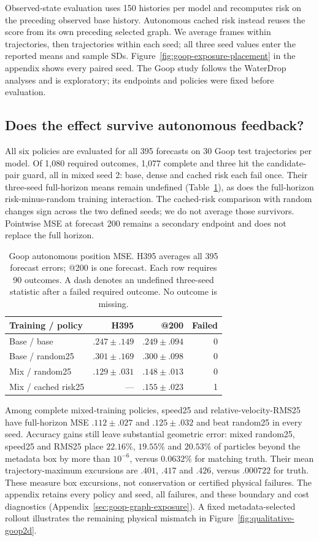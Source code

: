 Observed-state evaluation uses 150 histories per model and recomputes risk on the preceding observed base history. Autonomous cached risk instead reuses the score from its own preceding selected graph. We average frames within trajectories, then trajectories within each seed; all three seed values enter the reported means and sample SDs. Figure~\ref{fig:goop-exposure-placement} in the appendix shows every paired seed. The Goop study follows the WaterDrop analyses and is exploratory; its endpoints and policies were fixed before evaluation.

\subsection{Does the effect survive autonomous feedback?}
All six policies are evaluated for all 395 forecasts on 30 Goop test trajectories per model. Of 1,080 required outcomes, 1,077 complete and three hit the candidate-pair guard, all in mixed seed 2: base, dense and cached risk each fail once. Their three-seed full-horizon means remain undefined (Table~\ref{tab:goop-rollouts}), as does the full-horizon risk-minus-random training interaction. The cached-risk comparison with random changes sign across the two defined seeds; we do not average those survivors. Pointwise MSE at forecast 200 remains a secondary endpoint and does not replace the full horizon.

\begin{table}[t]
\centering\small
\caption{Goop autonomous position MSE. H395 averages all 395 forecast errors; @200 is one forecast. Each row requires 90 outcomes. A dash denotes an undefined three-seed statistic after a failed required outcome. No outcome is missing.}
\label{tab:goop-rollouts}
\setlength{\tabcolsep}{3pt}
\begin{tabular}{lrrr}
\toprule
Training / policy & H395 & @200 & Failed\\
\midrule
Base / base & $.247\pm.149$ & $.249\pm.094$ & 0\\
Base / random25 & $.301\pm.169$ & $.300\pm.098$ & 0\\
Mix / random25 & $.129\pm.031$ & $.148\pm.013$ & 0\\
Mix / cached risk25 & --- & $.155\pm.023$ & 1\\
\bottomrule
\end{tabular}
\end{table}

Among complete mixed-training policies, speed25 and relative-velocity-RMS25 have full-horizon MSE $.112\pm.027$ and $.125\pm.032$ and beat random25 in every seed. Accuracy gains still leave substantial geometric error: mixed random25, speed25 and RMS25 place $22.16\%$, $19.55\%$ and $20.53\%$ of particles beyond the metadata box by more than $10^{-6}$, versus $0.0632\%$ for matching truth. Their mean trajectory-maximum excursions are $.401$, $.417$ and $.426$, versus $.000722$ for truth. These measure box excursions, not conservation or certified physical failures. The appendix retains every policy and seed, all failures, and these boundary and cost diagnostics (Appendix~\ref{sec:goop-graph-exposure}). A fixed metadata-selected rollout illustrates the remaining physical mismatch in Figure~\ref{fig:qualitative-goop2d}.

